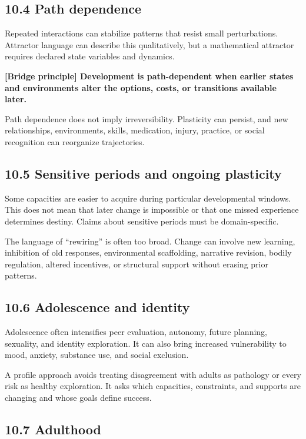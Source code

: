 \documentclass[
  11pt,
]{article}
\begin{document}
\subsection{10.4 Path dependence}\label{path-dependence}

Repeated interactions can stabilize patterns that resist small
perturbations. Attractor language can describe this qualitatively, but a
mathematical attractor requires declared state variables and dynamics.

\textbf{{[}Bridge principle{]} Development is path-dependent when
earlier states and environments alter the options, costs, or transitions
available later.}

Path dependence does not imply irreversibility. Plasticity can persist,
and new relationships, environments, skills, medication, injury,
practice, or social recognition can reorganize trajectories.

\subsection{10.5 Sensitive periods and ongoing
plasticity}\label{sensitive-periods-and-ongoing-plasticity}

Some capacities are easier to acquire during particular developmental
windows. This does not mean that later change is impossible or that one
missed experience determines destiny. Claims about sensitive periods
must be domain-specific.

The language of ``rewiring'' is often too broad. Change can involve new
learning, inhibition of old responses, environmental scaffolding,
narrative revision, bodily regulation, altered incentives, or structural
support without erasing prior patterns.

\subsection{10.6 Adolescence and
identity}\label{adolescence-and-identity}

Adolescence often intensifies peer evaluation, autonomy, future
planning, sexuality, and identity exploration. It can also bring
increased vulnerability to mood, anxiety, substance use, and social
exclusion.

A profile approach avoids treating disagreement with adults as pathology
or every risk as healthy exploration. It asks which capacities,
constraints, and supports are changing and whose goals define success.

\subsection{10.7 Adulthood}\label{adulthood}
\end{document}
